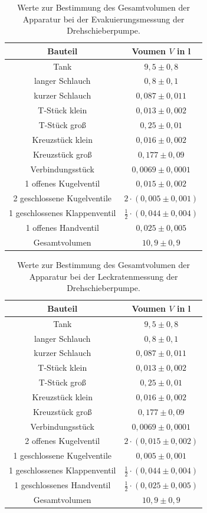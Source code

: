 \begin{table}[H]
\centering
\caption{Werte zur Bestimmung des Gesamtvolumen der Apparatur bei der Evakuierungsmessung der Drehschieberpumpe.}
\label{tab:Volumen_ED}
\begin{tabular}{c|c}
Bauteil & Voumen $V$ in l\\
\hline
Tank &$9,5 \pm 0,8$\\
langer Schlauch &$0,8 \pm 0,1$\\
kurzer Schlauch &$0,087 \pm 0,011$\\
T-Stück klein&$0,013 \pm 0,002$\\
T-Stück groß &$0,25 \pm 0,01$\\
Kreuzstück klein&$0,016 \pm 0,002$\\
Kreuzstück groß&$0,177 \pm 0,09$\\
Verbindungsstück&$0,0069 \pm 0,0001$\\
1 offenes Kugelventil&$0,015 \pm 0,002$\\
2 geschlossene Kugelventile&$ 2 \cdot(0,005 \pm 0,001)$\\
1 geschlossenes Klappenventil&$\frac{1}{2}\cdot(0,044 \pm 0,004)$\\
1 offenes Handventil&$0,025 \pm 0,005$\\
\hline
Gesamtvolumen&$10,9 \pm 0,9$\\
\end{tabular}
\end{table}

\begin{table}[H]
\centering
\caption{Werte zur Bestimmung des Gesamtvolumen der Apparatur bei der Leckratenmessung der Drehschieberpumpe.}
\label{tab:Volumen_LD}
\begin{tabular}{c|c}
Bauteil & Voumen $V$ in l\\
\hline
Tank &$9,5 \pm 0,8$\\
langer Schlauch &$0,8 \pm 0,1$\\
kurzer Schlauch &$0,087 \pm 0,011$\\
T-Stück klein&$0,013 \pm 0,002$\\
T-Stück groß &$0,25 \pm 0,01$\\
Kreuzstück klein&$0,016 \pm 0,002$\\
Kreuzstück groß&$0,177 \pm 0,09$\\
Verbindungsstück&$0,0069 \pm 0,0001$\\
2 offenes Kugelventil&$2\cdot(0,015 \pm 0,002)$\\
1 geschlossene Kugelventile&$ 0,005 \pm 0,001$\\
1 geschlossenes Klappenventil&$\frac{1}{2}\cdot(0,044 \pm 0,004)$\\
1 geschlossenes Handventil&$\frac{1}{2}\cdot(0,025 \pm 0,005)$\\
\hline
Gesamtvolumen&$ 10,9 \pm 0,9$\\
\end{tabular}
\end{table}
